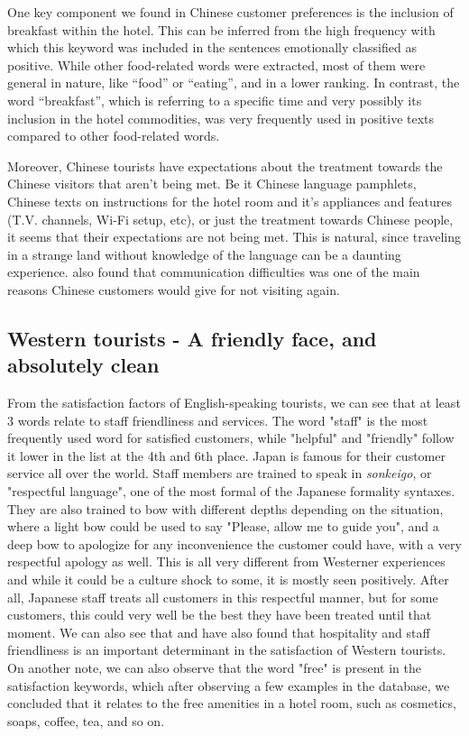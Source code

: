 One key component we found in Chinese customer preferences is the inclusion of breakfast within the hotel. This can be inferred from the high frequency with which this keyword was included in the sentences emotionally classified as positive. While other food-related words were extracted, most of them were general in nature, like “food” or “eating”, and in a lower ranking. In contrast, the word “breakfast”, which is referring to a specific time and very possibly its inclusion in the hotel commodities, was very frequently used in positive texts compared to other food-related words. 

Moreover, Chinese tourists have expectations about the treatment towards the Chinese visitors that aren't being met. Be it Chinese language pamphlets, Chinese texts on instructions for the hotel room and it's appliances and features (T.V. channels, Wi-Fi setup, etc), or just the treatment towards Chinese people, it seems that their expectations are not being met. This is natural, since traveling in a strange land without knowledge of the language can be a daunting experience. \cite{ryan2001} also found that communication difficulties was one of the main reasons Chinese customers would give for not visiting again. 

\subsection{Western tourists - A friendly face, and absolutely clean}\label{disc:en}

From the satisfaction factors of English-speaking tourists, we can see that at least 3 words relate to staff friendliness and services. The word "staff" is the most frequently used word for satisfied customers, while "helpful" and "friendly" follow it lower in the list at the 4th and 6th place. Japan is famous for their customer service all over the world. Staff members are trained to speak in \textit{sonkeigo}, or "respectful language", one of the most formal of the Japanese formality syntaxes. They are also trained to bow with different depths depending on the situation, where a light bow could be used to say "Please, allow me to guide you", and a deep bow to apologize for any inconvenience the customer could have, with a very respectful apology as well. This is all very different from Westerner experiences and while it could be a culture shock to some, it is mostly seen positively. After all, Japanese staff treats all customers in this respectful manner, but for some customers, this could very well be the best they have been treated until that moment. We can also see that \cite{kozak2002} and \cite{shanka2004} have also found that hospitality and staff friendliness is an important determinant in the satisfaction of Western tourists. On another note, we can also observe that the word "free" is present in the satisfaction keywords, which after observing a few examples in the database, we concluded that it relates to the free amenities in a hotel room, such as cosmetics, soaps, coffee, tea, and so on. 

